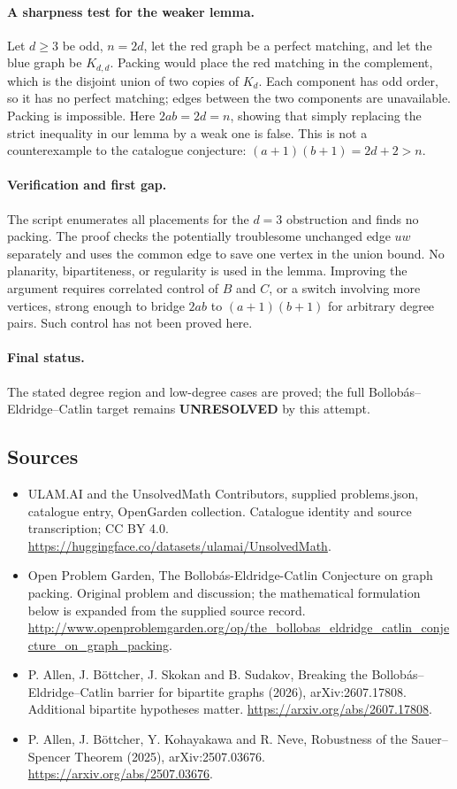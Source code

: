 \documentclass[11pt,a4paper]{article}
\begin{document}
\paragraph{A sharpness test for the weaker lemma.}
Let $d\ge3$ be odd, $n=2d$, let the red graph be a perfect matching, and let the blue graph be $K_{d,d}$. Packing would place the red matching in the complement, which is the disjoint union of two copies of $K_d$. Each component has odd order, so it has no perfect matching; edges between the two components are unavailable. Packing is impossible. Here $2ab=2d=n$, showing that simply replacing the strict inequality in our lemma by a weak one is false. This is not a counterexample to the catalogue conjecture: $(a+1)(b+1)=2d+2>n$.

\paragraph{Verification and first gap.}
The script enumerates all placements for the $d=3$ obstruction and finds no packing. The proof checks the potentially troublesome unchanged edge $uw$ separately and uses the common edge to save one vertex in the union bound. No planarity, bipartiteness, or regularity is used in the lemma. Improving the argument requires correlated control of $B$ and $C$, or a switch involving more vertices, strong enough to bridge $2ab$ to $(a+1)(b+1)$ for arbitrary degree pairs. Such control has not been proved here.

\paragraph{Final status.}
The stated degree region and low-degree cases are proved; the full Bollobás--Eldridge--Catlin target remains \textbf{UNRESOLVED} by this attempt.

\subsection{Sources}
\begin{itemize}
\item[S1] ULAM.AI and the UnsolvedMath Contributors, supplied problems.json, catalogue entry, OpenGarden collection. Catalogue identity and source transcription; CC BY 4.0.
\url{https://huggingface.co/datasets/ulamai/UnsolvedMath}.
\item[S2] Open Problem Garden, The Bollobás-Eldridge-Catlin Conjecture on graph packing. Original problem and discussion; the mathematical formulation below is expanded from the supplied source record.
\url{http://www.openproblemgarden.org/op/the_bollobas_eldridge_catlin_conjecture_on_graph_packing}.
\item[S3] P. Allen, J. Böttcher, J. Skokan and B. Sudakov, Breaking the Bollobás--Eldridge--Catlin barrier for bipartite graphs (2026), arXiv:2607.17808. Additional bipartite hypotheses matter.
\url{https://arxiv.org/abs/2607.17808}.
\item[S4] P. Allen, J. Böttcher, Y. Kohayakawa and R. Neve, Robustness of the Sauer--Spencer Theorem (2025), arXiv:2507.03676.
\url{https://arxiv.org/abs/2507.03676}.
\end{itemize}
\end{document}
